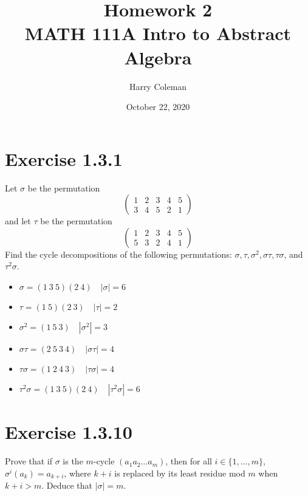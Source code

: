 \documentclass[12pt]{article}
\newenvironment{problem}
    {\begin{lrbox}{\mybox}\begin{minipage}{\textwidth-10pt}}
    {\end{minipage}\end{lrbox}\framebox[6.5in]{\usebox{\mybox}}}
\newcommand{\<}{\left\langle}
\renewcommand{\>}{\right\rangle}
\begin{document}
 
\title{Homework 2\\
    \large MATH 111A Intro to Abstract Algebra
}
\author{Harry Coleman}
\date{October 22, 2020}
\maketitle

\section*{Exercise 1.3.1}
\begin{problem}
    Let $\sigma$ be the permutation
    \[ \left( \begin{array}{ccccc}
        1 & 2 & 3 & 4 & 5 \\
        3 & 4 & 5 & 2 & 1
    \end{array}\right)\]
    and let $\tau$ be the permutation
    \[ \left( \begin{array}{ccccc}
        1 & 2 & 3 & 4 & 5 \\
        5 & 3 & 2 & 4 & 1
    \end{array}\right)\]
    Find the cycle decompositions of the following permutations: $\sigma, \tau, \sigma^2, \sigma\tau, \tau\sigma$, and $\tau^2\sigma$.
\end{problem}

\begin{itemize}
    \item $\sigma = (1\ 3\ 5)(2\ 4) \quad |\sigma| = 6$
    \item $\tau = (1\ 5)(2\ 3) \quad |\tau| = 2$
    \item $\sigma^2 = (1\ 5\ 3) \quad |\sigma^2| = 3$
    \item $\sigma\tau = (2\ 5\ 3\ 4) \quad |\sigma\tau| = 4$
    \item $\tau\sigma = (1\ 2\ 4\ 3) \quad |\tau\sigma| = 4$
    \item $\tau^2\sigma = (1\ 3\ 5)(2\ 4) \quad |\tau^2\sigma| = 6$
\end{itemize}


\newpage
\section*{Exercise 1.3.10}
\begin{problem}
    Prove that if $\sigma$ is the $m$-cycle $(a_1a_2\dots a_m)$, then for all $i\in\{1,\dots,m\}$, $\sigma^i(a_k)=a_{k+i}$, where $k+i$ is replaced by its least residue mod $m$ when $k+i>m$. Deduce that $|\sigma|=m$.
\end{problem}
\end{document}

